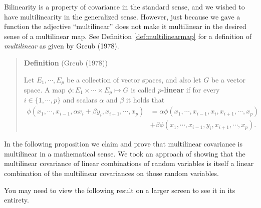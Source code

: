 \documentclass[
  letterpaper,
  DIV=11,
  numbers=noendperiod]{scrreprt}
\begin{document}
Bilinearity is a property of covariance in the standard sense, and we
wished to have multilinearity in the generalized sense. However, just
because we gave a function the adjective ``multilinear'' does not make
it multilinear in the desired sense of a multilinear map. See Definition
\ref{def:multilinearmap} for a definition of \emph{multilinear} as given
by Greub (1978).

\begin{quote}
\textbf{Definition} (Greub (1978))

Let \(E_1, \cdots, E_{p}\) be a collection of vector spaces, and also
let \(G\) be a vector space. A map
\(\phi: E_1 \times \cdots \times E_p \mapsto G\) is called
\textbf{\(p\)-linear} if for every \(i \in \{1, \cdots, p \}\) and
scalars \(\alpha\) and \(\beta\) it holds that \begin{align*}
\phi (x_1, \cdots, x_{i-1}, \alpha x_i + \beta y_i, x_{i+1}, \cdots, x_p) &= \alpha \phi (x_1, \cdots, x_{i-1}, x_i, x_{i+1}, \cdots, x_p) \\
&  + \beta \phi (x_1, \cdots, x_{i-1}, y_i, x_{i+1}, \cdots, x_p).
\end{align*}
\end{quote}

In the following proposition we claim and prove that multilinear
covariance is multilinear in a mathematical sense. We took an approach
of showing that the multilinear covariance of linear combinations of
random variables is itself a linear combination of the multilinear
covariances on those random variables.

\begin{tcolorbox}[enhanced jigsaw, colframe=quarto-callout-caution-color-frame, toptitle=1mm, bottomtitle=1mm, breakable, colbacktitle=quarto-callout-caution-color!10!white, arc=.35mm, coltitle=black, opacitybacktitle=0.6, opacityback=0, leftrule=.75mm, titlerule=0mm, title=\textcolor{quarto-callout-caution-color}{\faFire}\hspace{0.5em}{Screen Size}, rightrule=.15mm, toprule=.15mm, colback=white, bottomrule=.15mm, left=2mm]

You may need to view the following result on a larger screen to see it
in its entirety.

\end{tcolorbox}
\end{document}
